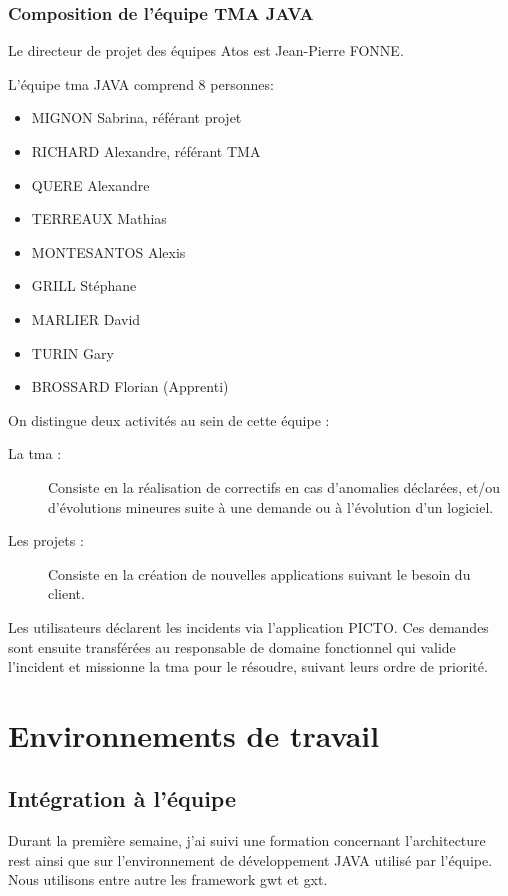 \documentclass[12pt]{report}
\begin{document}
    \subsection{Composition de l'équipe TMA JAVA}
    Le directeur de projet des équipes Atos est Jean-Pierre FONNE.
    
    L'équipe \gls{tma} JAVA comprend 8 personnes:\vspace{-1em}
    \begin{itemize}[itemsep=-0.5em]
        \item MIGNON Sabrina, référant projet
        \item RICHARD Alexandre, référant TMA
        \item QUERE Alexandre
        \item TERREAUX Mathias
        \item MONTESANTOS Alexis
        \item GRILL Stéphane
        \item MARLIER David
        \item TURIN Gary
        \item BROSSARD Florian (Apprenti)
    \end{itemize}
    On distingue deux activités au sein de cette équipe :\vspace{-1em}
    \begin{description}
        \item[La \gls{tma} :] Consiste en la réalisation de correctifs en cas d'anomalies déclarées, et/ou d'évolutions mineures suite à une demande ou à l'évolution d'un logiciel.
        \item[Les projets :] Consiste en la création de nouvelles applications suivant le besoin du client.
    \end{description}
    
    Les utilisateurs déclarent les incidents via l'application PICTO. Ces demandes sont ensuite transférées au responsable de domaine fonctionnel qui valide l’incident et missionne la \gls{tma} pour le résoudre, suivant leurs ordre de priorité.
    
    \chapter{Environnements de travail}
    
    \section{Intégration à l'équipe}
    Durant la première semaine, j'ai suivi une formation concernant l'architecture \acrshort{rest} ainsi que sur l'environnement de développement JAVA utilisé par l'équipe. Nous utilisons entre autre les framework \gls{gwt} et \gls{gxt}.
    
\end{document}
